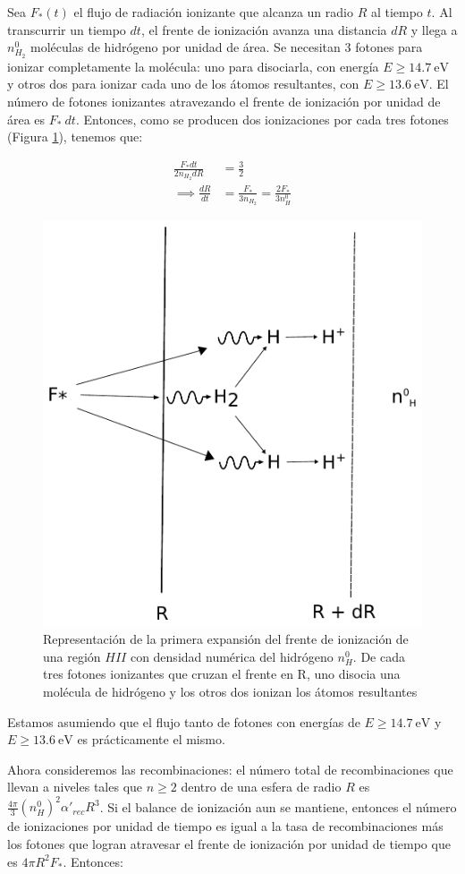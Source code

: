 Sea $F_*(t)$ el flujo de radiación ionizante que alcanza un radio $R$ al tiempo $t$. Al transcurrir un tiempo $dt$, el frente de ionización avanza una distancia $dR$ y llega a $n^0_{H_2}$ moléculas de hidrógeno por unidad de área. Se necesitan 3 fotones para ionizar completamente la molécula: uno para disociarla, con energía $E\geq 14.7\mathrm{~eV}$ y otros dos para ionizar cada uno de los átomos resultantes, con $E\geq13.6\mathrm{~eV}$. El número de fotones ionizantes atravezando el frente de ionización por unidad de área es $F_*~dt$. Entonces, como se producen dos ionizaciones por cada tres fotones (Figura \ref{fig:ionization}), tenemos que:

\begin{align}
  \frac{F_* dt}{2 n_{H_2} dR} &= \frac{3}{2} \\
  \implies \frac{dR}{dt} &= \frac{F_*}{3n_{H_2}} = \frac{2 F_*}{3 n^0_H}
\end{align}

\begin{figure}
  \includegraphics[width=0.6\linewidth]{./Figures/ionization}
  \caption{Representación de la primera expansión del frente de ionización de una región $HII$ con densidad numérica del hidrógeno $n^0_H$. De cada tres fotones ionizantes que cruzan el frente en R, uno disocia una molécula de hidrógeno y los otros dos ionizan los átomos resultantes \citep{Stahler:2004}}
  \label{fig:ionization}
\end{figure}


Estamos asumiendo que el flujo tanto de fotones con energías de $E\geq 14.7\mathrm{~eV}$ y $E\geq 13.6\mathrm{~eV}$ es prácticamente el mismo.

Ahora consideremos las recombinaciones: el número total de recombinaciones que llevan a niveles tales que $n \geq 2$ dentro de una esfera de radio $R$ es $\frac{4\pi}{3}\left(n^0_H\right)^2\alpha'_{rec}R^3$. Si el balance de ionización aun se mantiene, entonces el número de ionizaciones por unidad de tiempo es igual a la tasa de recombinaciones más los fotones que logran atravesar el frente de ionización por unidad de tiempo que es $4\pi R^2 F_*$. Entonces:


